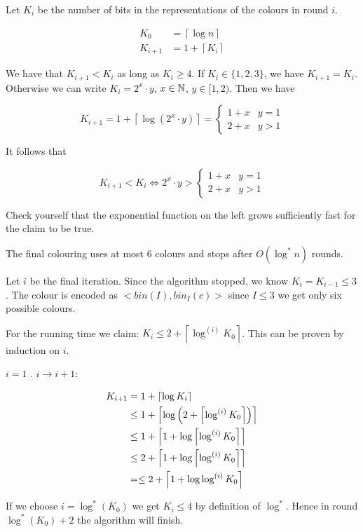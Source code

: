 \begin{lem} Let $K_i$ be the number of bits in the representations of the colours in round $i$.

\begin{align*}
K_0 &= \left\lceil \log n\right\rceil\\
K_{i+1} &= 1+\left\lceil K_i\right\rceil
\end{align*}

\end{lem}

\begin{pr}
We have that $K_{i+1} < K_i$ as long as $K_i\geq 4$. If $K_i\in \{1,2,3\}$, we have $K_{i+1}=K_i$. Otherwise we can write $K_i=2^x\cdot y$, $x\in \mathbb{N}$, $y\in [1,2)$. Then we have

\[K_{i+1} = 1+\left\lceil \log(2^x\cdot y)\right\rceil = \begin{cases} 1+x & y=1\\ 2+x &y>1\end{cases}\]

It follows that

\[K_{i+1}<K_i \Leftrightarrow 2^x\cdot y > \begin{cases} 1+x & y=1\\ 2+x &y>1\end{cases}\]

Check yourself that the exponential function on the left grows sufficiently fast for the claim to be true.
\end{pr}

\begin{thm} The final colouring uses at most 6 colours and stops after $O(\log^* n)$ rounds.\end{thm}

\begin{pr} Let $i$ be the final iteration. Since the algorithm stopped, we know $K_i=K_{i-1} \leq 3$. The colour is encoded as $<bin(I), bin_I(c)>$ since $I\leq 3$ we get only six possible colours.

For the running time we claim: $K_i\leq 2+ \left\lceil \log^{(i)} K_0 \right\rceil$. This can be proven by induction on $i$. 

$i=1$ \ok. $i\rightarrow i+1$:

\begin{align*}
K_{i+1}&= 1+\left\lceil \log K_i \right\rceil\\
	&\leq 1+ \left\lceil \log\left(2+\left\lceil \log^{(i)}K_0 \right\rceil\right) \right\rceil\\
	&\leq 1+\left\lceil 1+\log \left\lceil \log^{(i)} K_0 \right\rceil \right\rceil\\
	&\leq 2+\left\lceil 1+\log \left\lceil \log^{(i)} K_0 \right\rceil \right\rceil\\
	&=\leq 2+\left\lceil 1+\log \log^{(i)} K_0 \right\rceil\\
\end{align*}

If we choose $i=\log^*(K_0)$ we get $K_i\leq 4$ by definition of $\log^*$. Hence in round $\log^*(K_0)+2$ the algorithm will finish.
\end{pr}

